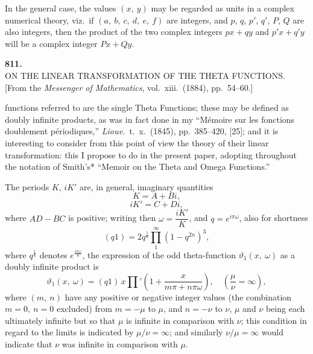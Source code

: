 \documentclass[11pt,a4paper]{article}
\providecommand{\textsc}[1]{{\scshape #1}}
\begin{document}
\medskip
In the general case, the values $(x,\ y)$ may be regarded as units in a complex numerical theory, viz.\ if $(a,\ b,\ c,\ d,\ e,\ f)$ are integers, and $p$, $q$, $p'$, $q'$, $P$, $Q$ are also integers, then the product of the two complex integers $px + qy$ and $p'x + q'y$ will be a complex integer $Px + Qy$.
\clearpage

\fancyhead[C]{\small\ }
\fancyhead[R]{\small [811}

\thispagestyle{plain}
\begin{center}
\vspace*{2em}
{\Large\bfseries 811.}\\[1.5em]
{\normalsize\scshape ON THE LINEAR TRANSFORMATION OF THE THETA FUNCTIONS.}\\[1em]
{\small [From the \textit{Messenger of Mathematics}, vol.~xiii.\ (1884), pp.~54--60.]}
\end{center}

\medskip
\noindent \textsc{The} functions referred to are the single Theta Functions; these may be defined as doubly infinite products, as was in fact done in my ``M\'emoire sur les fonctions doublement p\'eriodiques,'' \textit{Liouv.}\ t.~x.\ (1845), pp.~385--420, [25]; and it is interesting to consider from this point of view the theory of their linear transformation: this I propose to do in the present paper, adopting throughout the notation of Smith's* ``Memoir on the Theta and Omega Functions.''

\medskip
The periods $K$, $iK'$ are, in general, imaginary quantities
\[
K = A + Bi,
\]
\[
iK' = C + Di,
\]
where $AD - BC$ is positive; writing then $\omega = \dfrac{iK'}{K}$, and $q = e^{i\pi\omega}$, also for shortness
\[
(q1) = 2q^{\frac{1}{8}}\prod_{1}^{\infty}(1 - q^{2n})^{3},
\]
where $q^{\frac{1}{8}}$ denotes $e^{\frac{i\pi\omega}{8}}$, the expression of the odd theta-function $\vartheta_{1}(x,\ \omega)$ as a doubly infinite product is
\[
\vartheta_{1}(x,\ \omega) = (q1)\,x\prod\nolimits'\!\left(1 + \frac{x}{m\pi + n\pi\omega}\right),\quad \left(\frac{\mu}{\nu} = \infty\right),
\]
where $(m,\ n)$ have any positive or negative integer values (the combination $m = 0,\ n = 0$ excluded) from $m = -\mu$ to $\mu$, and $n = -\nu$ to $\nu$, $\mu$ and $\nu$ being each ultimately infinite but so that $\mu$ is infinite in comparison with $\nu$; this condition in regard to the limits is indicated by $\mu/\nu = \infty$; and similarly $\nu/\mu = \infty$ would indicate that $\nu$ was infinite in comparison with $\mu$.
\end{document}
